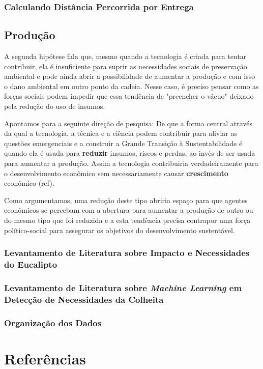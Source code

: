\documentclass[14pt,a4paper]{article}
\begin{document}
	\subsubsection{Calculando Distância Percorrida por Entrega}
	
	
	
	\subsection{Produção}
	
	A segunda hipótese fala que, mesmo quando a tecnologia é criada para tentar contribuir, ela é insuficiente para suprir as necessidades sociais de preservação ambiental e pode ainda abrir a possibilidade de aumentar a produção e com isso o dano ambiental em outro ponto da cadeia. Nesse caso, é preciso pensar como as forças sociais podem impedir que essa tendência de "preencher o vácuo" deixado pela redução do uso de insumos.
	
	Apontamos para a seguinte direção de pesquisa: De que a forma central através da qual a tecnologia, a técnica e a ciência podem contribuir para aliviar as questões emergenciais e a construir a Grande Transição à Sustentabilidade é quando ela é usada para \textbf{reduzir} insumos, riscos e perdas, ao invés de ser usada para aumentar a produção. Assim a tecnologia contribuiria verdadeiramente para o desenvolvimento econômico sem necessariamente causar \textbf{crescimento} econômico (ref). 
	
	Como argumentamos, uma redução deste tipo abriria espaço para que agentes econômicos se percebam com a abertura para aumentar a produção de outro ou do mesmo tipo que foi reduzida e a esta tendência precisa contrapor uma força político-social para assegurar os objetivos do desenvolvimento sustentável. 
	
	\subsubsection{Levantamento de Literatura sobre Impacto e Necessidades do Eucalipto}
	
	\subsubsection{Levantamento de Literatura sobre \textit{Machine Learning} em Detecção de Necessidades da Colheita}
	
	\subsubsection{Organização dos Dados }
	
	
	
	\section{Referências}
	
\end{document}
